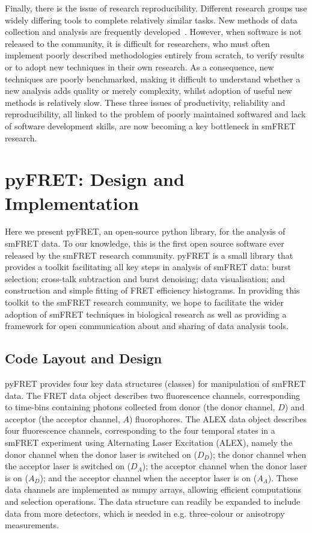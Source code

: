 Finally, there is the issue of research reproducibility. Different research groups use widely differing tools to complete relatively similar tasks. New methods of data collection and analysis are frequently developed~\cite{kapanidis05, nir06, sisamakis2010}. However, when software is not released to the community, it is difficult for researchers, who must often implement poorly described methodologies entirely from scratch, to verify results or to adopt new techniques in their own research. As a consequence, new techniques are poorly benchmarked, making it difficult to understand whether a new analysis adds quality or merely complexity, whilst adoption of useful new methods is relatively slow. These three issues of productivity, reliability and reproducibility, all linked to the problem of poorly maintained softwared and lack of software development skills, are now becoming a key bottleneck in smFRET research.  


\section{pyFRET: Design and Implementation}
Here we present pyFRET, an open-source python library, for the analysis of smFRET data. To our knowledge, this is the first open source software ever released by the smFRET research community. pyFRET is a small library that provides a toolkit facilitating all key steps in analysis of smFRET data: burst selection; cross-talk subtraction and burst denoising; data visualisation; and construction and simple fitting of FRET efficiency histograms. In providing this toolkit to the smFRET research community, we hope to facilitate the wider adoption of smFRET techniques in biological research as well as providing a framework for open communication about and sharing of data analysis tools.

\subsection{Code Layout and Design}
pyFRET provides four key data structures (classes) for manipulation of smFRET data. The FRET data object describes two fluorescence channels, corresponding to time-bins containing photons collected from donor (the donor channel, $D$) and acceptor (the acceptor channel, $A$) fluorophores. The ALEX data object describes four fluorescence channels, corresponding to the four temporal states in a smFRET experiment using Alternating Laser Excitation (ALEX), namely the donor channel when the donor laser is switched on ($D_D$); the donor channel when the acceptor laser is switched on ($D_A$); the acceptor channel when the donor laser is on ($A_D$); and the acceptor channel when the acceptor laser is on ($A_A$). These data channels are implemented as numpy arrays, allowing efficient computations and selection operations. The data structure can readily be expanded to include data from more detectors, which is needed in e.g. three-colour or anisotropy measurements.

